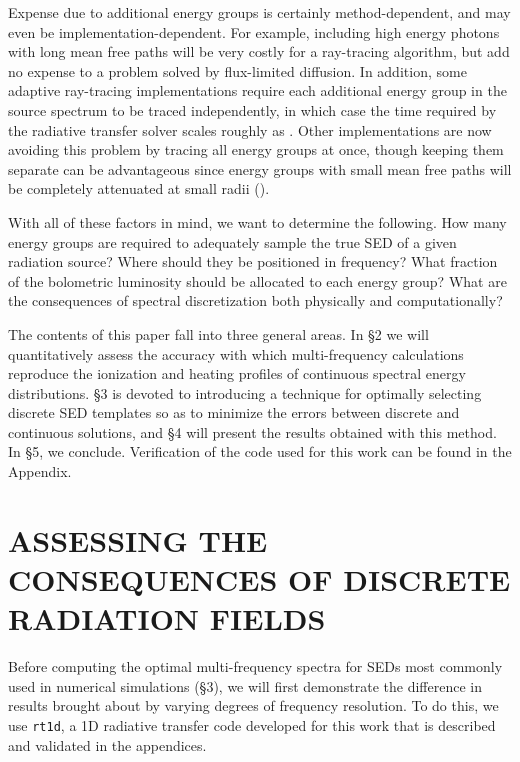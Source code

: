 \documentclass[preprint2]{aastex}              %
\begin{document}
Expense due to additional energy groups is certainly method-dependent, and may even be implementation-dependent.  For example, including high energy photons with long mean free paths will be very costly for a ray-tracing algorithm, but add no expense to a problem solved by flux-limited diffusion.  In addition, some adaptive ray-tracing implementations require each additional energy group in the source spectrum to be traced independently, in which case the time required by the radiative transfer solver scales roughly as \nnu.  Other implementations are now avoiding this problem by tracing all energy groups at once, though keeping them separate can be advantageous since energy groups with small mean free paths will be completely attenuated at small radii (\cite{Wise2011}).

With all of these factors in mind, we want to determine the following.  How many energy groups are required to adequately sample the true SED of a given radiation source?  Where should they be positioned in frequency?  What fraction of the bolometric luminosity should be allocated to each energy group?  What are the consequences of spectral discretization both physically and computationally?  

The contents of this paper fall into three general areas.  In \S2 we will quantitatively assess the accuracy with which multi-frequency calculations reproduce the ionization and heating profiles of continuous spectral energy distributions.  \S3 is devoted to introducing a technique for optimally selecting discrete SED templates so as to minimize the errors between discrete and continuous solutions, and \S4 will present the results obtained with this method.  In \S5, we conclude.  Verification of the code used for this work can be found in the Appendix.

\section{ASSESSING THE CONSEQUENCES OF DISCRETE RADIATION FIELDS} \label{sec:Consequences}
Before computing the optimal multi-frequency spectra for SEDs most commonly used in numerical simulations (\S3), we will first demonstrate the difference in results brought about by varying degrees of frequency resolution.  To do this, we use \texttt{rt1d}, a 1D radiative transfer code developed for this work that is described and validated in the appendices.  
\end{document}
